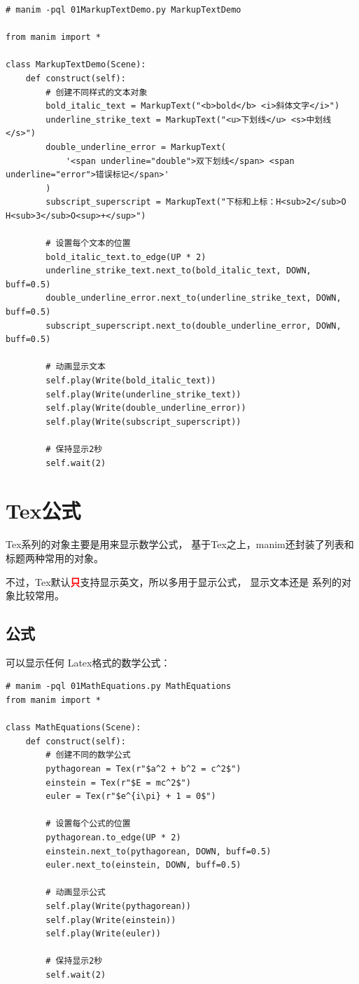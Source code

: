 \begin{lstlisting}[style=pythonstyle]
# manim -pql 01MarkupTextDemo.py MarkupTextDemo

from manim import *

class MarkupTextDemo(Scene):
    def construct(self):
        # 创建不同样式的文本对象
        bold_italic_text = MarkupText("<b>bold</b> <i>斜体文字</i>")
        underline_strike_text = MarkupText("<u>下划线</u> <s>中划线</s>")
        double_underline_error = MarkupText(
            '<span underline="double">双下划线</span> <span underline="error">错误标记</span>'
        )
        subscript_superscript = MarkupText("下标和上标：H<sub>2</sub>O H<sub>3</sub>O<sup>+</sup>")

        # 设置每个文本的位置
        bold_italic_text.to_edge(UP * 2)
        underline_strike_text.next_to(bold_italic_text, DOWN, buff=0.5)
        double_underline_error.next_to(underline_strike_text, DOWN, buff=0.5)
        subscript_superscript.next_to(double_underline_error, DOWN, buff=0.5)

        # 动画显示文本
        self.play(Write(bold_italic_text))
        self.play(Write(underline_strike_text))
        self.play(Write(double_underline_error))
        self.play(Write(subscript_superscript))

        # 保持显示2秒
        self.wait(2)
\end{lstlisting}        


\section{Tex公式}
\label{sec:manim_text_formula_formula}
Tex系列的对象主要是用来显示数学公式，
基于Tex之上，manim还封装了列表和标题两种常用的对象。

不过，Tex默认\textcolor{red}{\textbf{只}}支持显示英文，所以多用于显示公式，
显示文本还是  系列的对象比较常用。

\subsection{公式}
\label{subsec:manim_text_formula_formula_formula}
 可以显示任何 Latex格式的数学公式：

\begin{lstlisting}[style=pythonstyle]
# manim -pql 01MathEquations.py MathEquations    
from manim import *

class MathEquations(Scene):
    def construct(self):
        # 创建不同的数学公式
        pythagorean = Tex(r"$a^2 + b^2 = c^2$")
        einstein = Tex(r"$E = mc^2$")
        euler = Tex(r"$e^{i\pi} + 1 = 0$")

        # 设置每个公式的位置
        pythagorean.to_edge(UP * 2)
        einstein.next_to(pythagorean, DOWN, buff=0.5)
        euler.next_to(einstein, DOWN, buff=0.5)

        # 动画显示公式
        self.play(Write(pythagorean))
        self.play(Write(einstein))
        self.play(Write(euler))

        # 保持显示2秒
        self.wait(2)
\end{lstlisting}

